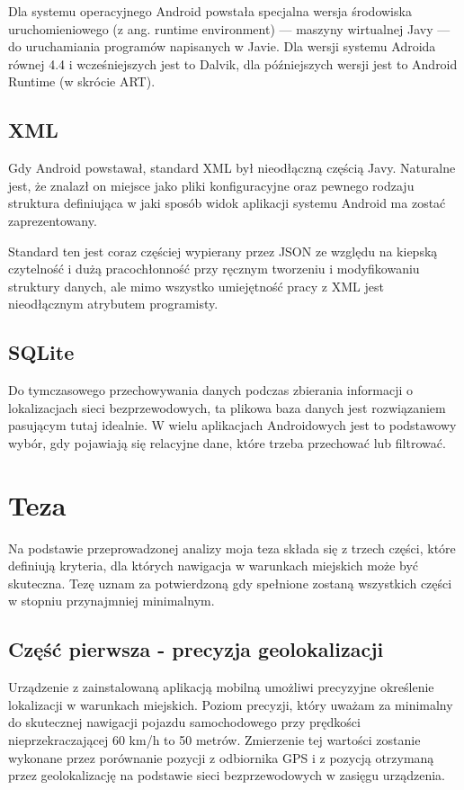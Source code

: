 Dla systemu operacyjnego Android powstała specjalna wersja środowiska uruchomieniowego (z ang. runtime environment) — maszyny wirtualnej Javy — do uruchamiania programów napisanych w Javie. Dla wersji systemu Adroida równej 4.4 i wcześniejszych jest to Dalvik, dla późniejszych wersji jest to Android Runtime (w skrócie ART).\cite{DalvikWiki}\cite{AndroidRuntimeWiki}

\subsection{XML}
Gdy Android powstawał, standard XML był nieodłączną częścią Javy. Naturalne jest, że znalazł on miejsce jako pliki konfiguracyjne oraz pewnego rodzaju struktura definiująca w jaki sposób widok aplikacji systemu Android ma zostać zaprezentowany.

Standard ten jest coraz częściej wypierany przez JSON ze względu na kiepską czytelność i dużą pracochłonność przy ręcznym tworzeniu i modyfikowaniu struktury danych, ale mimo wszystko umiejętność pracy z XML jest nieodłącznym atrybutem programisty.

\subsection{SQLite}
Do tymczasowego przechowywania danych podczas zbierania informacji o lokalizacjach sieci bezprzewodowych, ta plikowa baza danych jest rozwiązaniem pasującym tutaj idealnie. W wielu aplikacjach Androidowych jest to podstawowy wybór, gdy pojawiają się relacyjne dane, które trzeba przechować lub filtrować.

\section{Teza}
Na podstawie przeprowadzonej analizy moja teza składa się z trzech części, które definiują kryteria, dla których nawigacja w warunkach miejskich może być skuteczna. Tezę uznam za potwierdzoną gdy spełnione zostaną wszystkich części w stopniu przynajmniej minimalnym.

\subsection{Część pierwsza - precyzja geolokalizacji}
Urządzenie z zainstalowaną aplikacją mobilną umożliwi precyzyjne określenie lokalizacji w warunkach miejskich. Poziom precyzji, który uważam za minimalny do skutecznej nawigacji pojazdu samochodowego przy prędkości nieprzekraczającej 60 km/h to 50 metrów. Zmierzenie tej wartości zostanie wykonane przez porównanie pozycji z odbiornika GPS i z pozycją otrzymaną przez geolokalizację na podstawie sieci bezprzewodowych w zasięgu urządzenia.

